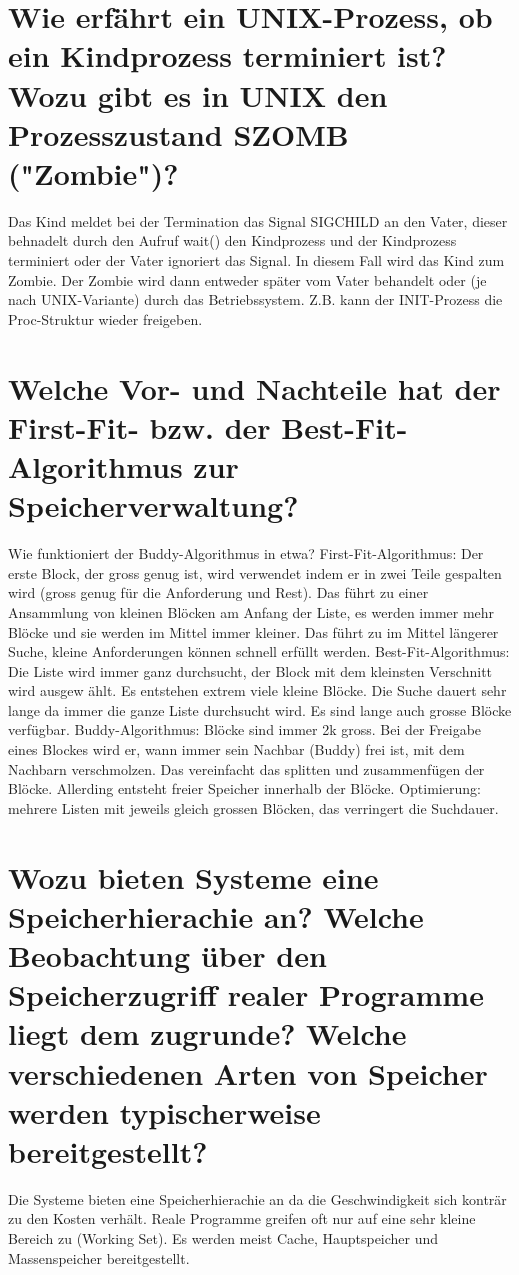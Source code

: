 \documentclass[12pt,a4paper,ngerman]{scrartcl}
\newcommand{\question}[1]{#1}
\newenvironment {answer}
                {}
                {}
\begin{document}
\section{\question{Wie erfährt ein UNIX-Prozess, ob ein Kindprozess terminiert ist? Wozu gibt es in UNIX den Prozesszustand SZOMB ("Zombie")?}}
\begin{answer}
Das Kind meldet bei der Termination das Signal SIGCHILD an den Vater, dieser behnadelt
durch den Aufruf wait() den Kindprozess und der Kindprozess terminiert
oder der Vater ignoriert das Signal. In diesem Fall wird das Kind zum Zombie. Der Zombie
wird dann entweder später vom Vater behandelt oder (je nach UNIX-Variante) durch das
Betriebssystem. Z.B. kann der INIT-Prozess die Proc-Struktur wieder freigeben.
\end{answer}

\section{\question{Welche Vor- und Nachteile hat der First-Fit- bzw. der Best-Fit-Algorithmus zur Speicherverwaltung?}}
\begin{answer}
Wie funktioniert der Buddy-Algorithmus in etwa?
First-Fit-Algorithmus:
Der erste Block, der gross genug ist, wird verwendet indem er in zwei Teile gespalten wird
(gross genug für die Anforderung und Rest).
Das führt zu einer Ansammlung von kleinen Blöcken am Anfang der Liste, es werden immer
mehr Blöcke und sie werden im Mittel immer kleiner. Das führt zu im Mittel längerer
Suche, kleine Anforderungen können schnell erfüllt werden.
Best-Fit-Algorithmus:
Die Liste wird immer ganz durchsucht, der Block mit dem kleinsten Verschnitt wird ausgew
ählt.
Es entstehen extrem viele kleine Blöcke. Die Suche dauert sehr lange da immer die ganze
Liste durchsucht wird. Es sind lange auch grosse Blöcke verfügbar.
Buddy-Algorithmus:
Blöcke sind immer 2k gross. Bei der Freigabe eines Blockes wird er, wann immer sein
Nachbar (Buddy) frei ist, mit dem Nachbarn verschmolzen.
Das vereinfacht das splitten und zusammenfügen der Blöcke. Allerding entsteht freier Speicher
innerhalb der Blöcke.
Optimierung: mehrere Listen mit jeweils gleich grossen Blöcken, das verringert die Suchdauer.
\end{answer}

\section{\question{Wozu bieten Systeme eine Speicherhierachie an? Welche Beobachtung über den Speicherzugriff realer Programme liegt dem zugrunde? Welche verschiedenen Arten von Speicher
werden typischerweise bereitgestellt?}}
\begin{answer}
Die Systeme bieten eine Speicherhierachie an da die Geschwindigkeit sich konträr zu den
Kosten verhält.
Reale Programme greifen oft nur auf eine sehr kleine Bereich zu (Working Set).
Es werden meist Cache, Hauptspeicher und Massenspeicher bereitgestellt.
\end{answer}
\end{document}
